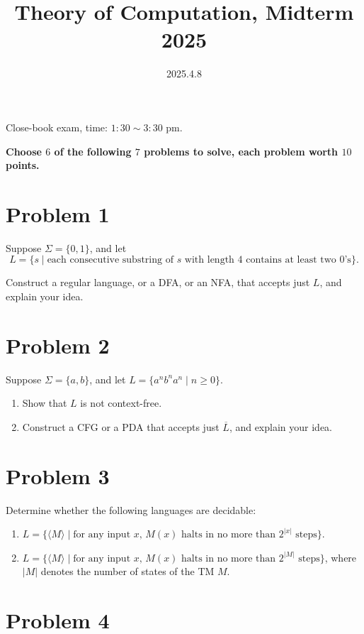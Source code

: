 \documentclass[12pt]{article}
\title{\textbf{Theory of Computation, Midterm 2025}}
\date{2025.4.8}
\begin{document}
\maketitle

Close-book exam, time: $1:30\sim 3:30$ pm.

\textbf{Choose $6$ of the following $7$ problems to solve, each problem worth $10$ points.}

\section*{Problem 1}

Suppose $\Sigma=\{0,1\}$, and let 
$$L=\{s\mid \text{each consecutive substring of } s \text{ with length } 4 \text{ contains at least two 0's}\}.$$

Construct a regular language, or a DFA, or an NFA, that accepts just $L$, and explain your idea.

\section*{Problem 2}

Suppose $\Sigma=\{a,b\}$, and let $L=\{a^nb^na^n\mid n\ge 0\}$.

\begin{enumerate}
	\item Show that $L$ is not context-free.
	\item Construct a CFG or a PDA that accepts just $\overline{L}$, and explain your idea.
\end{enumerate}

\section*{Problem 3}

Determine whether the following languages are decidable:

\begin{enumerate}
	\item $L=\{\langle M\rangle \mid \text{for any input } x \text{, } M(x) \text{ halts in no more than } 2^{\lvert x\rvert} \text{ steps}\}$.
	\item $L=\{\langle M\rangle \mid \text{for any input } x \text{, } M(x) \text{ halts in no more than } 2^{\lvert M\rvert} \text{ steps}\}$, where $\lvert M\rvert$ denotes the number of states of the TM $M$.
\end{enumerate}

\section*{Problem 4}
\end{document}
